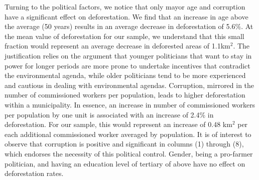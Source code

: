 Turning to the political factors, we notice that only mayor age and corruption have a significant effect on deforestation. We find that an increase in age above the average (50 years) results in an average decrease in deforestation of 5.6$\%$. At the mean value of deforestation for our sample, we understand that this small fraction would represent an average decrease in deforested areas of 1.1km$^{2}$. The justification relies on the argument that younger politicians that want to stay in power for longer periods are more prone to undertake incentives that contradict the environmental agenda, while older politicians tend to be more experienced and cautious in dealing with environmental agendas. Corruption, mirrored in the number of commissioned workers per population, leads to higher deforestation within a municipality. In essence, an increase in number of commissioned workers per population by one unit  is associated with an increase of 2.4\% in deforestation. For our sample, this would represent an increase of 0.48 km$^{2}$ per each additional commissioned worker averaged by population. It is of interest to observe that corruption is positive and significant in columns (1) through (8), which endorses the necessity of this political control. Gender, being a pro-farmer politician, and having an education level of tertiary of above have no effect on deforestation rates.

